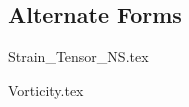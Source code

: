 \documentclass[class=report, 12pt, crop=false]{standalone}
\begin{document}
\begin{center}


\section{Alternate Forms}

{Strain_Tensor_NS.tex}

{Vorticity.tex}


\end{center}
\end{document}
